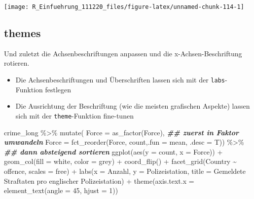 \documentclass[
]{book}
\newenvironment{Shaded}{\begin{snugshade}}{\end{snugshade}}
\newcommand{\AttributeTok}[1]{\textcolor[rgb]{0.77,0.63,0.00}{#1}}
\newcommand{\DecValTok}[1]{\textcolor[rgb]{0.00,0.00,0.81}{#1}}
\newcommand{\DocumentationTok}[1]{\textcolor[rgb]{0.56,0.35,0.01}{\textbf{\textit{#1}}}}
\newcommand{\FunctionTok}[1]{\textcolor[rgb]{0.00,0.00,0.00}{#1}}
\newcommand{\NormalTok}[1]{#1}
\newcommand{\SpecialCharTok}[1]{\textcolor[rgb]{0.00,0.00,0.00}{#1}}
\newcommand{\StringTok}[1]{\textcolor[rgb]{0.31,0.60,0.02}{#1}}
\begin{document}
\begin{center}\texttt{[image: R\_Einfuehrung\_111220\_files/figure-latex/unnamed-chunk-114-1]} \end{center}

\hypertarget{themes}{%
\subsection{themes}\label{themes}}

Und zuletzt die Achsenbeschriftungen anpassen und die x-Achsen-Beschriftung rotieren.

\begin{itemize}
\item
  Die Achsenbeschriftungen und Überschriften lassen sich mit der \texttt{labs}-Funktion festlegen
\item
  Die Ausrichtung der Beschriftung (wie die meisten grafischen Aspekte) lassen sich mit der \texttt{theme}-Funktion fine-tunen
\end{itemize}

\begin{Shaded}
\begin{Highlighting}[]
\NormalTok{crime\_long }\SpecialCharTok{\%\textgreater{}\%} 
  \FunctionTok{mutate}\NormalTok{(}
      \AttributeTok{Force =} \FunctionTok{as\_factor}\NormalTok{(Force), }\DocumentationTok{\#\# zuerst in Faktor umwandeln}
      \AttributeTok{Force =} \FunctionTok{fct\_reorder}\NormalTok{(Force, count,}\AttributeTok{.fun =}\NormalTok{ mean, }\AttributeTok{.desc =}\NormalTok{ T)) }\SpecialCharTok{\%\textgreater{}\%} \DocumentationTok{\#\# dann absteigend sortieren}
\FunctionTok{ggplot}\NormalTok{(}\FunctionTok{aes}\NormalTok{(}\AttributeTok{y =}\NormalTok{ count,}
             \AttributeTok{x =}\NormalTok{ Force)) }\SpecialCharTok{+}
  \FunctionTok{geom\_col}\NormalTok{(}\AttributeTok{fill =} \StringTok{\textquotesingle{}white\textquotesingle{}}\NormalTok{,}
           \AttributeTok{color =} \StringTok{\textquotesingle{}grey\textquotesingle{}}\NormalTok{) }\SpecialCharTok{+}
  \FunctionTok{coord\_flip}\NormalTok{() }\SpecialCharTok{+}
  \FunctionTok{facet\_grid}\NormalTok{(Country }\SpecialCharTok{\textasciitilde{}}\NormalTok{ offence, }
             \AttributeTok{scales =} \StringTok{\textquotesingle{}free\textquotesingle{}}\NormalTok{) }\SpecialCharTok{+}
  \FunctionTok{labs}\NormalTok{(}\AttributeTok{x =} \StringTok{\textquotesingle{}Anzahl\textquotesingle{}}\NormalTok{,}
       \AttributeTok{y =} \StringTok{\textquotesingle{}Polizeistation\textquotesingle{}}\NormalTok{,}
       \AttributeTok{title =} \StringTok{\textquotesingle{}Gemeldete Straftaten pro englischer Polizeistation\textquotesingle{}}\NormalTok{) }\SpecialCharTok{+}
  \FunctionTok{theme}\NormalTok{(}\AttributeTok{axis.text.x =} \FunctionTok{element\_text}\NormalTok{(}\AttributeTok{angle =} \DecValTok{45}\NormalTok{,}
                                   \AttributeTok{hjust =} \DecValTok{1}\NormalTok{))}
\end{Highlighting}
\end{Shaded}
\end{document}
